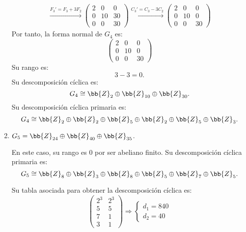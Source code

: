 \begin{ejercicio}
\begin{enumerate}
\begin{multline*}
            \xrightarrow{F_3'=F_3+3F_2}
            \begin{pmatrix}
                2 & 0 & 0 \\
                0 & 10 & 30 \\
                0 & 0 & 30
            \end{pmatrix}
            \xrightarrow{C_3'=C_3-3C_2}
            \begin{pmatrix}
                2 & 0 & 0 \\
                0 & 10 & 0 \\
                0 & 0 & 30
            \end{pmatrix}
        \end{multline*}
        Por tanto, la forma normal de $G_4$ es:
        \begin{equation*}
            \begin{pmatrix}
                2 & 0 & 0 \\
                0 & 10 & 0 \\
                0 & 0 & 30
            \end{pmatrix}
        \end{equation*}
        Su rango es:
        \begin{equation*}
            3-3= 0.
        \end{equation*}
        Su descomposición cíclica es:
        \begin{equation*}
            G_4 \cong \bb{Z}_2 \oplus \bb{Z}_{10} \oplus \bb{Z}_{30}.
        \end{equation*}
        Su descomposición cíclica primaria es:
        \begin{equation*}
            G_4 \cong \bb{Z}_2 \oplus \bb{Z}_2 \oplus \bb{Z}_5 \oplus \bb{Z}_2 \oplus \bb{Z}_5 \oplus \bb{Z}_3.
        \end{equation*}
        \item $G_5 = \bb{Z}_{24} \oplus \bb{Z}_{40} \oplus \bb{Z}_{35}$.
        
        En este caso, su rango es $0$ por ser abeliano finito. Su descomposición cíclica primaria es:
        \begin{equation*}
            G_5 \cong \bb{Z}_8 \oplus \bb{Z}_3 \oplus \bb{Z}_8 \oplus \bb{Z}_5 \oplus \bb{Z}_7 \oplus \bb{Z}_5.
        \end{equation*}

        Su tabla asociada para obtener la descomposición cíclica es:
        \begin{equation*}
            \begin{pmatrix}
                2^3 & 2^3 \\
                5 & 5 \\
                7 & 1\\
                3 & 1
            \end{pmatrix}
            \Longrightarrow
            \begin{cases}
                d_1 = 840\\
                d_2 = 40
            \end{cases}
        \end{equation*}


\end{enumerate}
\end{ejercicio}
